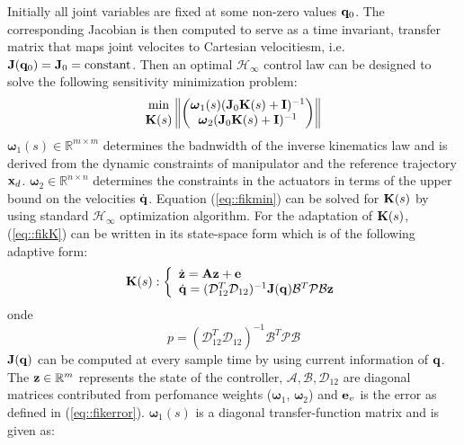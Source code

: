 Initially all joint variables are fixed at some non-zero values ${\bf q}_0$. The corresponding Jacobian is then computed to serve as a time invariant, transfer matrix that maps joint velocites to Cartesian velocitiesm, i.e. ${\bf J}({\bf q}_0) = {\bf J}_0 = \text{constant}$. Then an optimal ${\mathcal H}_{\infty}$ control law can be designed to solve the following sensitivity minimization problem:
%
\begin{equation}
\label{eq::fikmin}
\begin{matrix}
\text{min} \\
{\bf K}(s) \\
\end{matrix}
\left\|
\left(
\begin{matrix}
 {\boldsymbol \omega}_1(s)({\bf J}_0{\bf K}(s)+{\bf I})^{-1} \\
 {\boldsymbol \omega}_2({\bf J}_0{\bf K}(s)+{\bf I})^{-1}
\end{matrix}
\right)
\right\|
\end{equation}
%
${\boldsymbol \omega}_1(s)\in {\mathbb R}^{m \times m}$ determines the badnwidth of the inverse kinematics law and is derived from the dynamic constraints of manipulator and the reference trajectory ${\bf x}_d$. ${\boldsymbol \omega}_2 \in {\mathbb R}^{n \times n}$ determines the constraints in the actuators in terms of the upper bound on the velocities $\dot{\bf q}$. Equation (\ref{eq::fikmin}) can be solved for ${\bf K}(s)$ by using standard ${\mathcal H}_\infty$ optimization algorithm.
%
For the adaptation of ${\bf K}(s)$, (\ref{eq::fikK}) can be written in its state-space form which is of the following adaptive form:
%
\begin{equation}
{\bf K}(s): \left\{\begin{array}{ll}
\dot{\bf z} = {\bf A}{\bf z} + {\bf e} \\
\dot{\bf q} = ({\mathcal D}_{12}^T{\mathcal D}_{12})^{-1}{\bf J}({\bf q}){\mathcal B}^T{\mathcal P}{\mathcal B}{\bf z} \\
\end{array} \right.
\end{equation}
%
onde 
%
\begin{equation}
p = ({\mathcal D}_{12}^T{\mathcal D}_{12})^{-1}{\mathcal B}^T{\mathcal P}{\mathcal B}
\end{equation}
%
${\bf J}({\bf q})$ can be computed at every sample time by using current information of ${\bf q}$. The ${\bf z} \in {\mathbb R}^m$ represents the state of the controller, ${\mathcal A},{\mathcal B},{\mathcal D}_{12}$ are diagonal matrices contributed from perfomance weights (${\boldsymbol \omega}_1$, ${\boldsymbol \omega}_2$) and ${\bf e}_v$ is the error as defined in (\ref{eq::fikerror}). ${\boldsymbol \omega}_1(s)$ is a diagonal transfer-function matrix and is given as:
